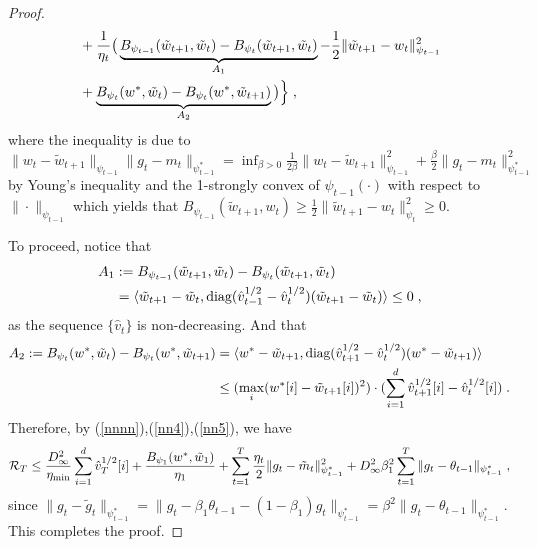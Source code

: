 \documentclass[wcp]{jmlr}
\begin{document}
\begin{proof}
\begin{equation}
\begin{aligned}
 &  + \frac{1}{\eta_t} \big(\underbrace{B_{\psi_{t-1}}(\tilde{w}_{t+1}, \tilde{w}_{t}) - B_{\psi_t}(\tilde{w}_{t+1}, \tilde{w}_{t}) }_{A_1}- \frac{1}{2} \| \tilde{w}_{t+1} - w_t \|_{\psi_{t-1}}^2\\
 &+\underbrace{B_{\psi_t}( w^*, \tilde{w}_{t}) -B_{\psi_t}(w^*,  \tilde{w}_{t+1} )}_{A_2}  \big) \Big\} \eqsp,
\end{aligned}
\end{equation}
where the inequality is due to $ \| w_t - \tilde{w}_{t+1}   \|_{\psi_{t-1}} \| g_t - m_t  \|_{\psi_{t-1}^*} = \inf_{ \beta > 0 }   \frac{1}{2\beta} \| w_t - \tilde{w}_{t+1} \|_{\psi_{t-1}}^2 +  \frac{\beta}{2} \| g_t - m_t  \|_{\psi_{t-1}^*}^2$ by Young's inequality and the 1-strongly convex of $\psi_{t-1}(\cdot)$ with respect to $\| \cdot \|_{\psi_{t-1}}$ which yields that $B_{\psi_{t-1}}(\tilde{w}_{t+1}, w_t )  \geq \frac{1}{2} \| \tilde{w}_{t+1} -  w_t  \|^2_{\psi_t} \geq 0$. 

To proceed, notice that
\begin{equation} \label{nn5}
\begin{aligned}
A_1& :=  B_{\psi_{t-1}}(\tilde{w}_{t+1}, \tilde{w}_{t}) - B_{\psi_t}(\tilde{w}_{t+1}, \tilde{w}_{t})  \\
& = \langle \tilde{w}_{t+1} - \tilde{w}_{t} , \text{diag}(\hat{v}_{t-1}^{1/2} -\hat{v}_t^{1/2} ) ( \tilde{w}_{t+1}- \tilde{w}_{t} ) \rangle \leq 0 \eqsp,
\end{aligned}
\end{equation}
as the sequence $\{\hat{v}_t\}$ is non-decreasing. And that
\begin{equation}  \label{nn4}
\begin{aligned}
A_2 := B_{\psi_t}( w^*, \tilde{w}_{t}) -B_{\psi_t}(w^*,  \tilde{w}_{t+1} )  &= \langle w^* - \tilde{w}_{t+1}  , \text{diag}(\hat{v}_{t+1}^{1/2} -\hat{v}_t^{1/2} ) ( w^* - \tilde{w}_{t+1}  ) \rangle\\
  & \leq ( \max_i (w^*[i] -  \tilde{w}_{t+1} [i] )^2  )\cdot ( \sum_{i=1}^d \hat{v}_{t+1}^{1/2}[i] -\hat{v}_t^{1/2}[i] ) \eqsp.
\end{aligned}
\end{equation}
Therefore, by (\ref{nnnn}),(\ref{nn4}),(\ref{nn5}), we have
\begin{equation}\notag
\begin{aligned}
\mathcal{R}_T \leq  \frac{D_{\infty}^2}{\eta_{\min}}  \sum_{i=1}^d \hat{v}_{T}^{1/2}[i] + \frac{ B_{\psi_1}(w^*, \tilde{w}_{1})}{\eta_1}
+ \sum_{t=1}^T\frac{\eta_t}{2} \| g_t - \tilde{m}_t  \|_{\psi_{t-1}^*}^2  +D_{\infty}^2 \beta_1^2  \sum_{t=1}^T \| g_t - \theta_{t-1}  \|_{\psi_{t-1}^*}  \eqsp,
\end{aligned}
\end{equation}
since $  \| g_t - \tilde{g}_t  \|_{\psi_{t-1}^*} =  \| g_t - \beta_1 \theta_{t-1} -(1- \beta_1) g_t \|_{\psi_{t-1}^*} = \beta^2 \| g_t - \theta_{t-1}  \|_{\psi_{t-1}^*} $.
This completes the proof.

\end{proof}
\end{document}
